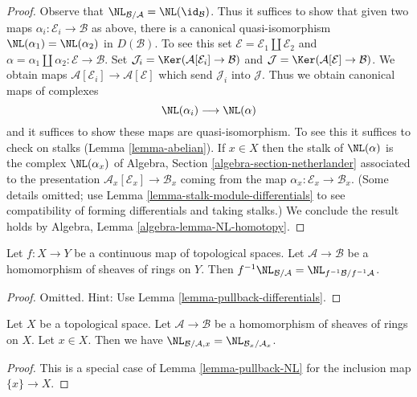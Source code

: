 \begin{proof}
Observe that $\NL_{\mathcal{B}/\mathcal{A}} = \NL(\id_\mathcal{B})$.
Thus it suffices to show that given two maps
$\alpha_i : \mathcal{E}_i \to \mathcal{B}$ as above, there is a
canonical quasi-isomorphism $\NL(\alpha_1) = \NL(\alpha_2)$ in $D(\mathcal{B})$.
To see this set $\mathcal{E} = \mathcal{E}_1 \amalg \mathcal{E}_2$ and
$\alpha = \alpha_1 \amalg \alpha_2 : \mathcal{E} \to \mathcal{B}$.
Set
$\mathcal{J}_i = \Ker(\mathcal{A}[\mathcal{E}_i] \to \mathcal{B})$
and
$\mathcal{J} = \Ker(\mathcal{A}[\mathcal{E}] \to \mathcal{B})$.
We obtain maps $\mathcal{A}[\mathcal{E}_i] \to \mathcal{A}[\mathcal{E}]$
which send $\mathcal{J}_i$ into $\mathcal{J}$.
Thus we obtain canonical maps of complexes
$$
\NL(\alpha_i) \longrightarrow \NL(\alpha)
$$
and it suffices to show these maps are quasi-isomorphism. To see this
it suffices to check on stalks (Lemma \ref{lemma-abelian}). If $x \in X$
then the stalk of $\NL(\alpha)$ is the complex $\NL(\alpha_x)$ of
Algebra, Section \ref{algebra-section-netherlander}
associated to the presentation $\mathcal{A}_x[\mathcal{E}_x] \to \mathcal{B}_x$
coming from the map $\alpha_x : \mathcal{E}_x \to \mathcal{B}_x$.
(Some details omitted; use Lemma \ref{lemma-stalk-module-differentials}
to see compatibility of forming differentials and taking stalks.)
We conclude the result holds by
Algebra, Lemma \ref{algebra-lemma-NL-homotopy}.
\end{proof}

\begin{lemma}
\label{lemma-pullback-NL}
Let $f : X \to Y$ be a continuous map of topological spaces.
Let $\mathcal{A} \to \mathcal{B}$ be a homomorphism of sheaves of rings
on $Y$. Then $f^{-1}\NL_{\mathcal{B}/\mathcal{A}} =
\NL_{f^{-1}\mathcal{B}/f^{-1}\mathcal{A}}$.
\end{lemma}

\begin{proof}
Omitted. Hint: Use Lemma \ref{lemma-pullback-differentials}.
\end{proof}

\begin{lemma}
\label{lemma-stalk-NL}
Let $X$ be a topological space. Let $\mathcal{A} \to \mathcal{B}$
be a homomorphism of sheaves of rings on $X$. Let $x \in X$.
Then we have $\NL_{\mathcal{B}/\mathcal{A}, x} =
\NL_{\mathcal{B}_x/\mathcal{A}_x}$.
\end{lemma}

\begin{proof}
This is a special case of Lemma \ref{lemma-pullback-NL}
for the inclusion map $\{x\} \to X$.
\end{proof}

